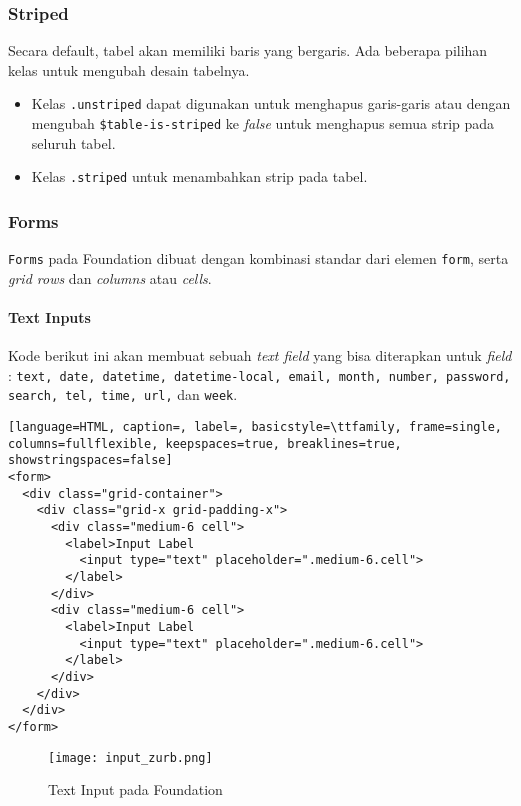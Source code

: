 \subsubsection{Striped}
Secara default, tabel akan memiliki baris yang bergaris. 
Ada beberapa pilihan kelas untuk mengubah desain tabelnya.
\begin{itemize}
	\item Kelas \texttt{.unstriped} dapat digunakan untuk menghapus garis-garis atau dengan mengubah \verb|$table-is-striped| ke \textit{false} untuk menghapus semua strip pada seluruh tabel.
	\item Kelas \texttt{.striped} untuk menambahkan strip pada tabel.	
\end{itemize}

\subsubsection{Forms}
\texttt{Forms} pada Foundation dibuat dengan kombinasi standar dari elemen \texttt{form}, serta \textit{grid rows} dan \textit{columns} atau \textit{cells}. 

\paragraph{Text Inputs}
Kode berikut ini akan membuat sebuah \textit{text field} yang bisa diterapkan untuk \textit{field} : \texttt{text, date, datetime, datetime-local, email, month, number, password, search, tel, time, url,} dan \texttt{week}.

\begin{lstlisting}[language=HTML, caption=, label=, basicstyle=\ttfamily, frame=single, columns=fullflexible, keepspaces=true, breaklines=true, showstringspaces=false] 
<form>
  <div class="grid-container">
    <div class="grid-x grid-padding-x">
      <div class="medium-6 cell">
        <label>Input Label
          <input type="text" placeholder=".medium-6.cell">
        </label>
      </div>
      <div class="medium-6 cell">
        <label>Input Label
          <input type="text" placeholder=".medium-6.cell">
        </label>
      </div>
    </div>
  </div>
</form>
\end{lstlisting}

\begin{figure} [H]
	\centering  
	\texttt{[image: input\_zurb.png]}  
	\caption{Text Input pada Foundation}
	\label{fig:gridbasic_zurb} 
\end{figure}

